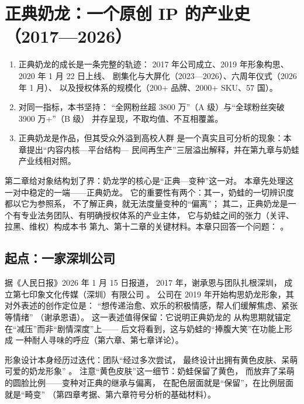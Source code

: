\chapter{正典奶龙：一个原创 IP 的产业史（2017—2026）}\label{ch:03}

\begin{nlkeypoints}
  \begin{enumerate}[label=(\arabic*),leftmargin=2.4em]
    \item 正典奶龙的成长是一条完整的轨迹：
          2017 年公司成立、2019 年形象构思、2020 年 1 月 22 日上线、
          剧集化与大屏化（2023—2026）、六周年仪式（2026 年 1 月）、
          以及授权体系的规模化（200+ 品牌、2000+ SKU、57 国）。
    \item 对同一指标，本书坚持：
          “全网粉丝超 3800 万”（A 级）与“全球粉丝突破 3900 万+”（B 级）
          并存呈现，不取均值、不互相覆盖。
    \item 正典奶龙是作品，但其受众外溢到高校人群
          是一个真实且可分析的现象：本章提出“内容内核—平台结构—
          民间再生产”三层溢出解释，并在第九章与奶蛙产业线相对照。
  \end{enumerate}
\end{nlkeypoints}

第二章给对象结构划了界：奶龙学的核心是“正典—变种”这一对。
本章先处理这一对中稳定的一端——正典奶龙。
它的重要性有两个：其一，奶蛙的一切辨识度都以它为参照系，
不了解正典，就无法度量变种的“偏离”；
其二，正典奶龙是一个有专业法务团队、有明确授权体系的产业主体，
它与奶蛙之间的张力（关评、拉黑、维权）构成本书
第九、第十二章的关键材料。本章只回答一个问题：
。

\section{起点：一家深圳公司}\label{sec:03:origin}

据《人民日报》2026 年 1 月 15 日报道，
2017 年，谢承恩与团队扎根深圳，
成立第七印象文化传媒（深圳）有限公司
\cite{jiang2026nailong}。
公司在 2019 年开始构思奶龙形象，其对外表述的创作定位是：
“想传递治愈、欢乐的积极情感，帮人们缓解焦虑、紧张等情绪”
（谢承恩语）\cite{jiang2026nailong}。
这一表述值得保留：它说明正典奶龙的
从构思期就锚定在“减压”而非“剧情深度”上——
后文将看到，这与奶蛙的“捧腹大笑”在功能上形成
一种耐人寻味的呼应（第六章、第七章详论）。

形象设计本身经历过迭代：团队“经过多次尝试，
最终设计出拥有黄色皮肤、呆萌可爱的奶龙形象”
\cite{jiang2026nailong}。
注意“黄色皮肤”这一细节：奶蛙保留了黄色，
而放弃了呆萌的圆脸比例——变种对正典的继承与偏离，
在配色层面就是“保留”，在比例层面就是“畸变”
（第四章考据、第六章符号分析的基础材料）。

